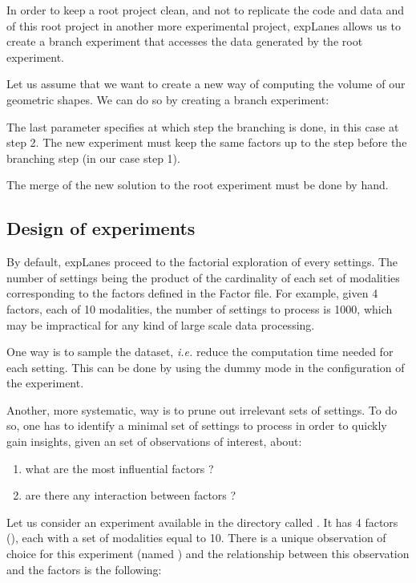 \documentclass[a4paper,fleqn]{tufte-handout}
\newcommand{\explanes}{\textsf{expLanes} }
\begin{document}
In order to keep a root project clean, and not to replicate the code and data and of this root project in another more experimental project, \explanes allows us to create a branch experiment that accesses the data generated by the root experiment.

Let us assume that we want to create a new way of computing the volume of our geometric shapes. We can do so by creating a branch experiment:


The last parameter specifies at which step the branching is done, in this case at step 2.
The new experiment must keep the same factors up to the step before the branching step (in our case step 1).

The merge of the new solution to the root experiment must be done by hand.

\subsection{Design of experiments}

By default, \explanes proceed to the factorial exploration of every settings. The number of settings being the product of the cardinality of each set of modalities corresponding to the factors defined in the Factor file. For example, given 4 factors, each of 10 modalities, the number of settings to process is 1000, which may be impractical for any kind of large scale data processing.

One way is to sample the dataset, \textit{i.e.} reduce the computation time needed for each setting. This can be done by using the dummy mode in the configuration of the experiment.

Another, more systematic, way is to prune out irrelevant sets of settings. To do so, one has to identify a minimal set of settings to process in order to quickly gain insights, given an set of observations of interest, about:
\begin{enumerate}
\item what are the most influential factors ?
\item are there any interaction between factors ?
\end{enumerate}

Let us consider an experiment available in the  directory called . It has 4 factors (), each with a set of modalities equal to 10. There is a unique observation  of choice for this experiment (named ) and the relationship between this observation and the factors is the following:
\end{document}
